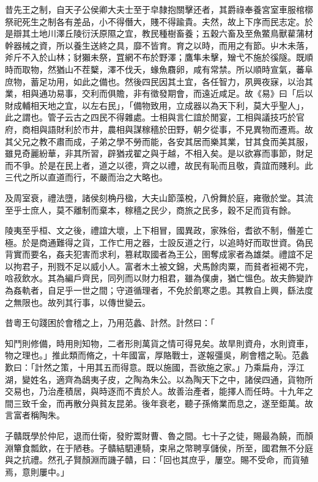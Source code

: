 
\begin{pinyinscope}
昔先王之制，自天子公侯卿大夫士至于皁隸抱關擊还者，其爵祿奉養宮室車服棺槨祭祀死生之制各有差品，小不得僭大，賤不得踰貴。夫然，故上下序而民志定。於是辯其土地川澤丘陵衍沃原隰之宜，教民種樹畜養；五穀六畜及至魚鱉鳥獸雚蒲材幹器械之資，所以養生送終之具，靡不皆育。育之以時，而用之有節。屮木未落，斧斤不入於山林；豺獺未祭，罝網不布於野澤；鷹隼未擊，矰弋不施於徯隧。既順時而取物，然猶山不茬櫱，澤不伐夭，蝝魚麛卵，咸有常禁。所以順時宣氣，蕃阜庶物，蓄足功用，如此之備也。然後四民因其土宜，各任智力，夙興夜寐，以治其業，相與通功易事，交利而俱贍，非有徵發期會，而遠近咸足。故《易》曰「后以財成輔相天地之宜，以左右民」，「備物致用，立成器以為天下利，莫大乎聖人」，此之謂也。管子云古之四民不得雜處。士相與言仁誼於閒宴，工相與議技巧於官府，商相與語財利於市井，農相與謀稼穡於田野，朝夕從事，不見異物而遷焉。故其父兄之教不肅而成，子弟之學不勞而能，各安其居而樂其業，甘其食而美其服，雖見奇麗紛華，非其所習，辟猶戎翟之與于越，不相入矣。是以欲寡而事節，財足而不爭。於是在民上者，道之以德，齊之以禮，故民有恥而且敬，貴誼而賤利。此三代之所以直道而行，不嚴而治之大略也。

及周室衰，禮法墮，諸侯刻桷丹楹，大夫山節藻梲，八佾舞於庭，雍徹於堂。其流至乎士庶人，莫不離制而棄本，稼穡之民少，商旅之民多，穀不足而貨有餘。

陵夷至乎桓、文之後，禮誼大壞，上下相冒，國異政，家殊俗，耆欲不制，僭差亡極。於是商通難得之貨，工作亡用之器，士設反道之行，以追時好而取世資。偽民背實而要名，姦夫犯害而求利，篡弒取國者為王公，圉奪成家者為雄桀。禮誼不足以拘君子，刑戮不足以威小人。富者木土被文錦，犬馬餘肉粟，而貧者裋褐不完，唅菽飲水。其為編戶齊民，同列而以財力相君，雖為僕虜，猶亡慍色。故夫飾變詐為姦軌者，自足乎一世之間；守道循理者，不免於飢寒之患。其教自上興，繇法度之無限也。故列其行事，以傳世變云。

昔粵王句踐困於會稽之上，乃用范蠡、計然。計然曰：「

知鬥則修備，時用則知物，二者形則萬貨之情可得見矣。故旱則資舟，水則資車，物之理也。」推此類而脩之，十年國富，厚賂戰士，遂報彊吳，刷會稽之恥。范蠡歎曰：「計然之策，十用其五而得意。既以施國，吾欲施之家。」乃乘扁舟，浮江湖，變姓名，適齊為鴟夷子皮，之陶為朱公。以為陶天下之中，諸侯四通，貨物所交易也，乃治產積居，與時逐而不責於人。故善治產者，能擇人而任時。十九年之間三致千金，而再散分與貧友昆弟。後年衰老，聽子孫脩業而息之，遂至鉅萬。故言富者稱陶朱。

子贛既學於仲尼，退而仕衛，發貯鬻財曹、魯之間。七十子之徒，賜最為饒，而顏淵簞食瓢飲，在于陋巷。子贛結駟連騎，束帛之幣聘享儲侯，所至，國君無不分庭與之抗禮。然孔子賢顏淵而譏子贛，曰：「回也其庶乎，屢空。賜不受命，而貨殖焉，意則屢中。」


\end{pinyinscope}
